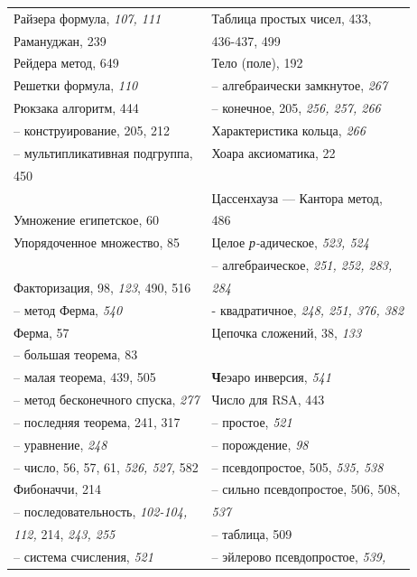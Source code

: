 \documentclass{mai_book}
\begin{document}
{\newpage
{}
\begin{tabular}{ll}
	Райзера формула, {\itshape 107, 111} & 
Таблица простых чисел, 433, \\
	Рамануджан, 239 & 436-437, 499 \\
Рейдера метод, 649 &  Тело (поле), 192 \\
	Решетки формула, \emph{110} & -- алгебраически замкнутое, \emph{267} \\
	Рюкзака алгоритм, 444 & -- конечное, 205, {\itshape 256, 257, 266} \\
	-- конструирование, 205, 212 & Характеристика кольца, \emph{266} \\
	-- мультипликативная подгруппа, & Хоара аксиоматика, 22 \\
	450 & \\
	&  Цассенхауза — Кантора метод, \\
	Умножение египетское, 60 & 486\\
	Упорядоченное множество, 85 & 
Целое \emph{р-}адическое, {\itshape 523, 524} \\
	& -- алгебраическое, {\itshape 251, 252, 283,} \\
	Факторизация, 98, \emph{123}, 490, 516 & \emph{284} \\
	-- метод Ферма, \emph{540} & - квадратичное, {\itshape 248, 251, 376, 382}  \\
	Ферма, 57 & Цепочка сложений, 38, \emph{133} \\
	-- большая теорема, 83 & \\
	-- малая теорема, 439, 505 & \textbf{Ч}еэаро инверсия, \emph{541} \\
	-- метод бесконечного спуска, \emph{277} & Число для RSA, 443 \\
	-- последняя теорема, 241, 317 & -- простое, \emph{521} \\
	-- уравнение, \emph{248} & -- порождение, \emph{98} \\
	-- число, 56, 57, 61, {\itshape 526, 527,} 582 & -- псевдопростое, 505, {\itshape 535, 538} \\
	Фибоначчи, 214 & -- сильно псевдопростое, 506, 508, \\
	-- последовательность, \emph{102-104,} & \emph{537} \\
	\emph{112,} 214, {\itshape 243, 255} & -- таблица, 509 \\
	-- система счисления, \emph{521} & -- эйлерово псевдопростое, \emph{539,} \\

\end{tabular}}
\end{document}
